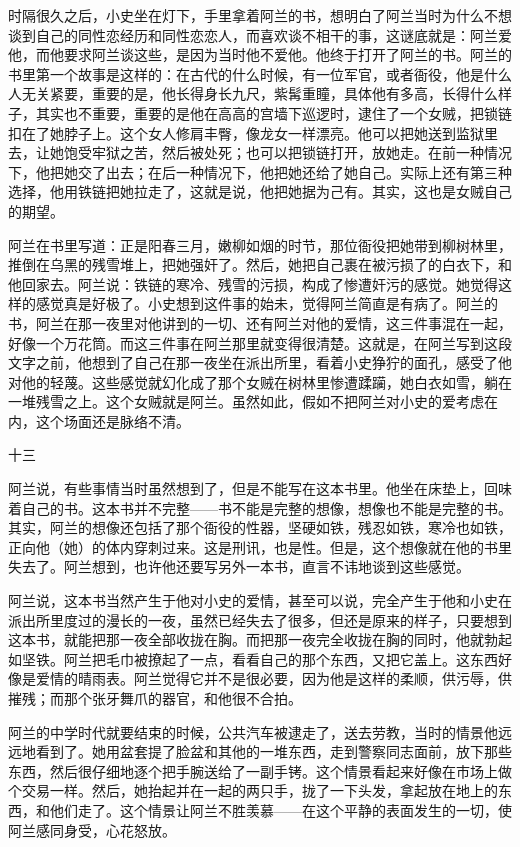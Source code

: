 时隔很久之后，小史坐在灯下，手里拿着阿兰的书，想明白了阿兰当时为什么不想谈到自己的同性恋经历和同性恋恋人，而喜欢谈不相干的事，这谜底就是：阿兰爱他，而他要求阿兰谈这些，是因为当时他不爱他。他终于打开了阿兰的书。阿兰的书里第一个故事是这样的：在古代的什么时候，有一位军官，或者衙役，他是什么人无关紧要，重要的是，他长得身长九尺，紫髯重瞳，具体他有多高，长得什么样子，其实也不重要，重要的是他在高高的宫墙下巡逻时，逮住了一个女贼，把锁链扣在了她脖子上。这个女人修肩丰臀，像龙女一样漂亮。他可以把她送到监狱里去，让她饱受牢狱之苦，然后被处死；也可以把锁链打开，放她走。在前一种情况下，他把她交了出去；在后一种情况下，他把她还给了她自己。实际上还有第三种选择，他用铁链把她拉走了，这就是说，他把她据为己有。其实，这也是女贼自己的期望。 

阿兰在书里写道：正是阳春三月，嫩柳如烟的时节，那位衙役把她带到柳树林里，推倒在乌黑的残雪堆上，把她强奸了。然后，她把自己裹在被污损了的白衣下，和他回家去。阿兰说：铁链的寒冷、残雪的污损，构成了惨遭奸污的感觉。她觉得这样的感觉真是好极了。小史想到这件事的始未，觉得阿兰简直是有病了。阿兰的书，阿兰在那一夜里对他讲到的一切、还有阿兰对他的爱情，这三件事混在一起，好像一个万花筒。而这三件事在阿兰那里就变得很清楚。这就是，在阿兰写到这段文字之前，他想到了自己在那一夜坐在派出所里，看着小史狰狞的面孔，感受了他对他的轻蔑。这些感觉就幻化成了那个女贼在树林里惨遭蹂躏，她白衣如雪，躺在一堆残雪之上。这个女贼就是阿兰。虽然如此，假如不把阿兰对小史的爱考虑在内，这个场面还是脉络不清。 

十三 

阿兰说，有些事情当时虽然想到了，但是不能写在这本书里。他坐在床垫上，回味着自己的书。这本书并不完整——书不能是完整的想像，想像也不能是完整的书。其实，阿兰的想像还包括了那个衙役的性器，坚硬如铁，残忍如铁，寒冷也如铁，正向他（她）的体内穿刺过来。这是刑讯，也是性。但是，这个想像就在他的书里失去了。阿兰想到，也许他还要写另外一本书，直言不讳地谈到这些感觉。 

阿兰说，这本书当然产生于他对小史的爱情，甚至可以说，完全产生于他和小史在派出所里度过的漫长的一夜，虽然已经失去了很多，但还是原来的样子，只要想到这本书，就能把那一夜全部收拢在胸。而把那一夜完全收拢在胸的同时，他就勃起如坚铁。阿兰把毛巾被撩起了一点，看看自己的那个东西，又把它盖上。这东西好像是爱情的晴雨表。阿兰觉得它并不是很必要，因为他是这样的柔顺，供污辱，供摧残；而那个张牙舞爪的器官，和他很不合拍。 

阿兰的中学时代就要结束的时候，公共汽车被逮走了，送去劳教，当时的情景他远远地看到了。她用盆套提了脸盆和其他的一堆东西，走到警察同志面前，放下那些东西，然后很仔细地逐个把手腕送给了一副手铐。这个情景看起来好像在市场上做个交易一样。然后，她抬起并在一起的两只手，拢了一下头发，拿起放在地上的东西，和他们走了。这个情景让阿兰不胜羡慕——在这个平静的表面发生的一切，使阿兰感同身受，心花怒放。 

